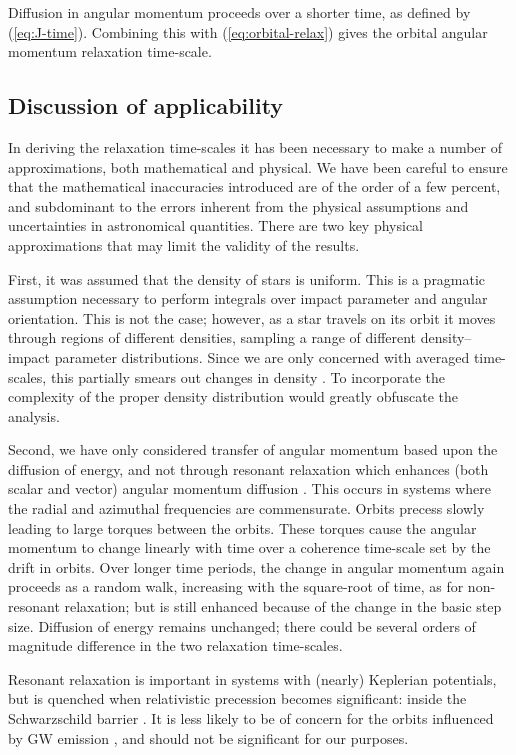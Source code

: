 \documentclass[useAMS,usedcolumn,usegraphicx,usenatbib]{mn2e}
\newcommand{\eqnref}[1]{(\ref{eq:#1})}
\begin{document}
\begin{onecolumn}
Diffusion in angular momentum proceeds over a shorter time, as defined by \eqnref{J-time}. Combining this with \eqnref{orbital-relax} gives the orbital angular momentum relaxation time-scale.

\subsection{Discussion of applicability}

In deriving the relaxation time-scales it has been necessary to make a number of approximations, both mathematical and physical. We have been careful to ensure that the mathematical inaccuracies introduced are of the order of a few percent, and subdominant to the errors inherent from the physical assumptions and uncertainties in astronomical quantities. There are two key physical approximations that may limit the validity of the results.

First, it was assumed that the density of stars is uniform. This is a pragmatic assumption necessary to perform integrals over impact parameter and angular orientation. This is not the case; however, as a star travels on its orbit it moves through regions of different densities, sampling a range of different density--impact parameter distributions. Since we are only concerned with averaged time-scales, this partially smears out changes in density \citep[cf.][]{Just2011}. To incorporate the complexity of the proper density distribution would greatly obfuscate the analysis.

Second, we have only considered transfer of angular momentum based upon the diffusion of energy, and not through resonant relaxation which enhances (both scalar and vector) angular momentum diffusion \citep{Rauch1996,Rauch1998,Gurkan2007,Eilon2009,Madigan2011}. This occurs in systems where the radial and azimuthal frequencies are commensurate. Orbits precess slowly leading to large torques between the orbits. These torques cause the angular momentum to change linearly with time over a coherence time-scale set by the drift in orbits. Over longer time periods, the change in angular momentum again proceeds as a random walk, increasing with the square-root of time, as for non-resonant relaxation; but is still enhanced because of the change in the basic step size. Diffusion of energy remains unchanged; there could be several orders of magnitude difference in the two relaxation time-scales.

Resonant relaxation is important in systems with (nearly) Keplerian potentials, but is quenched when relativistic precession becomes significant: inside the Schwarzschild barrier \citep{Merritt2011}. It is less likely to be of concern for the orbits influenced by GW emission \citep{Sigurdsson1997}, and should not be significant for our purposes.


\end{onecolumn}
\end{document}
